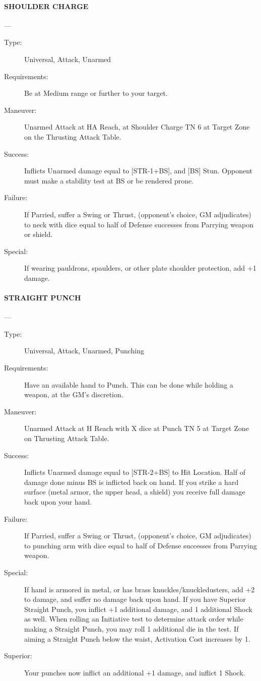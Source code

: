 \documentclass[oneside,11pt,english]{book}
\begin{document}
\paragraph{\large\label{man:SHOULDER CHARGE} SHOULDER CHARGE}---\quad{\large[X]}
\vspace{-10pt}\begin{description} 
\item [Type:] Universal, Attack, Unarmed 
\item [Requirements:] Be at Medium range or further to your target. 
\item [Maneuver:] Unarmed Attack at HA Reach, at Shoulder Charge TN 6 at Target Zone on the Thrusting 
Attack Table. 
\item [Success:] Inflicts Unarmed damage equal to [STR-1+BS], and [BS] Stun. Opponent must make a stability 
test at BS or be rendered prone. 
\item [Failure:] If Parried, suffer a Swing or Thrust, (opponent’s choice, GM adjudicates) to neck with dice 
equal to half of Defense successes from Parrying weapon or shield. 
\item [Special:] If wearing pauldrons, spaulders, or other plate shoulder protection, add +1 damage. 
\end{description}
 

\paragraph{\large\label{man:STRAIGHT PUNCH} STRAIGHT PUNCH}---\quad{\large[X]}
\vspace{-10pt}\begin{description} 
\item [Type:] Universal, Attack, Unarmed, Punching 
\item [Requirements:] Have an available hand to Punch. This can be done while holding a weapon, at the GM's 
discretion. 
\item [Maneuver:] Unarmed Attack at H Reach with X dice at Punch TN 5 at Target Zone on Thrusting Attack 
Table. 
\item [Success:] Inflicts Unarmed damage equal to [STR-2+BS] to Hit Location. Half of damage done minus BS 
is inflicted back on hand. If you strike a hard surface (metal armor, the upper head, a shield) you receive 
full damage back upon your hand. 
\item [Failure:] If Parried, suffer a Swing or Thrust, (opponent’s choice, GM adjudicates) to punching arm with 
dice equal to half of Defense successes from Parrying weapon. 
\item [Special:] If hand is armored in metal, or has brass knuckles/knuckledusters, add +2 to damage, and suffer 
no damage back upon hand. If you have Superior Straight Punch, you inflict +1 additional damage, and 1 
additional Shock as well. 
When rolling an Initiative test to determine attack order while making a Straight Punch, you may roll 1 
additional die in the test. 
If aiming a Straight Punch below the waist, Activation Cost increases by 1. 
\item [Superior:] Your punches now inflict an additional +1 damage, and inflict 1 Shock. 
\end{description}
\end{document}
